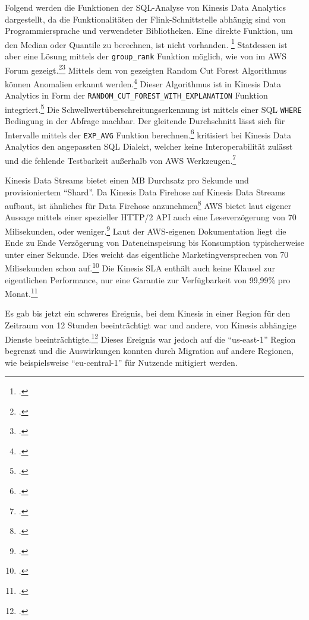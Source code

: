 Folgend werden die Funktionen der \ac{SQL}-Analyse von Kinesis Data Analytics dargestellt, da die Funktionalitäten der Flink-Schnittstelle abhängig sind von Programmiersprache und verwendeter Bibliotheken. 
Eine direkte Funktion, um den Median oder Quantile zu berechnen, ist nicht vorhanden. \footcite[Vgl.][]{RyanN.2018} Statdessen ist aber eine Lösung mittels der \texttt{group_rank} Funktion möglich, wie von \citeauthor{RyanN.2018} im \ac{AWS} Forum gezeigt.\footcite[Vgl.][]{AmazonWebServicesInc..o.J.as}\nzitat\footcite[Vgl.][]{RyanN.2018}
Mittels dem von \citeauthor{Guha.2016} gezeigten Random Cut Forest Algorithmus können Anomalien erkannt werden.\footcite[Vgl.][1]{Guha.2016} Dieser Algorithmus ist in Kinesis Data Analytics in Form der \texttt{RANDOM_CUT_FOREST_WITH_EXPLANATION} Funktion integriert.\footcite[Vgl.][]{AmazonWebServicesInc..o.J.ar}
Die Schwellwertüberschreitungserkennung ist mittels einer \ac{SQL} \texttt{WHERE} Bedingung in der Abfrage machbar.
Der gleitende Durchschnitt lässt sich für Intervalle mittels der \texttt{EXP_AVG} Funktion berechnen.\footcite[Vgl.][]{AmazonWebServicesInc..o.J.aq}
\citeauthor{Herman.2020} kritisiert bei Kinesis Data Analytics den angepassten \ac{SQL} Dialekt, welcher keine Interoperabilität zulässt und die fehlende Testbarkeit außerhalb von \ac{AWS} Werkzeugen.\footcite[Vgl.][]{Herman.2020}

Kinesis Data Streams bietet einen MB Durchsatz pro Sekunde und provisioniertem \enquote{Shard}. Da Kinesis Data Firehose auf Kinesis Data Streams aufbaut, ist ähnliches für Data Firehose anzunehmen\footcite[Vgl.][]{Pogosova.28.05.2020} 
\ac{AWS} bietet laut eigener Aussage mittels einer spezieller HTTP/2 \ac{API} auch eine Leseverzögerung von 70 Milisekunden, oder weniger.\footcite[Vgl.][]{AmazonWebServicesInc..o.J.af} 
Laut der \ac{AWS}-eigenen Dokumentation liegt die Ende zu Ende Verzögerung von Dateneinspeisung bis Konsumption typischerweise unter einer Sekunde. Dies weicht das eigentliche Marketingversprechen von 70 Milisekunden schon auf.\footcite[Vgl.][]{AmazonWebServicesInc..o.J.ae}
Die Kinesis \ac{SLA} enthält auch keine Klausel zur eigentlichen Performance, nur eine Garantie zur Verfügbarkeit von 99,99\% pro Monat.\footcite[Vgl.][]{AmazonWebServicesInc..o.J.ad} 

Es gab bis jetzt ein schweres Ereignis, bei dem Kinesis in einer Region für den Zeitraum von 12 Stunden beeinträchtigt war und andere, von Kinesis abhängige Dienste beeinträchtigte.\footcite[Vgl. auch im Folgenden][]{AmazonWebServicesInc..2020e} Dieses Ereignis war jedoch auf die \enquote{us-east-1} Region begrenzt und die Auswirkungen konnten durch Migration auf andere Regionen, wie beispielsweise \enquote{eu-central-1} für Nutzende mitigiert werden.



